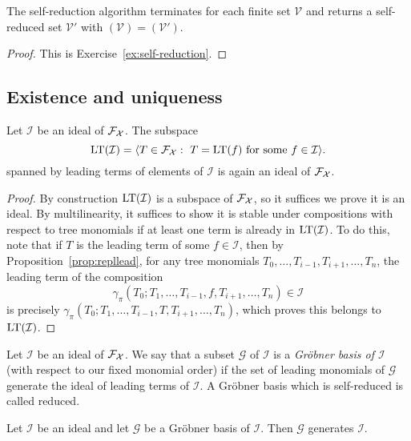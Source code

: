  \begin{proposition}\label{lemma:self-reduction}
 The self-reduction algorithm terminates for each
 finite set $\mathcal V$ and returns a self-reduced
 set $\mathcal V'$ with $(\mathcal V) = (\mathcal V')$.
\end{proposition}  

\begin{proof}
This is Exercise~\ref{ex:self-reduction}.
\end{proof}
\subsection{Existence and uniqueness}

\begin{lemma}
Let $\mathcal I$ be an ideal of $\mathcal{F}_{\mathcal{X}}$. The subspace 
\[
\operatorname{LT}(\mathcal I) = \langle T \in \mathcal{F}_{\mathcal{X}} : \text{ $T = 
	\operatorname{LT}(f)$ for some  $f\in\mathcal I$} \rangle.
\]
spanned by leading terms of elements of $\mathcal I$ is
again an ideal of $\mathcal{F}_{\mathcal{X}}$.
\end{lemma}

\begin{proof}
By construction $\operatorname{LT}(\mathcal I)$ is a subspace of $\mathcal{F}_{\mathcal{X}}$, so 
it suffices we prove it is an ideal. By multilinearity, it suffices
to show it is stable under compositions with respect to tree
monomials if at least one term is already in $\operatorname{LT}(\mathcal I)$.
To do this, note that if
$T$ is the leading term of some $f\in\mathcal I$, then by
Proposition~\ref{prop:repllead}, for any tree monomials
$T_0,\ldots,T_{i-1},T_{i+1},\ldots,T_n$, the leading term
of the composition 
\[ \gamma_\pi(T_0;T_1,\ldots,T_{i-1},f,T_{i+1},\ldots,T_n)\in \mathcal I\]
is precisely $\gamma_\pi(T_0;T_1,\ldots,T_{i-1},T,T_{i+1},\ldots,T_n)$,
which proves this belongs to $\operatorname{LT}(\mathcal I)$.
\end{proof}

\begin{definition}
Let $\mathcal I$ be an ideal of $\mathcal{F}_{\mathcal{X}}$. We say that a subset
$\mathcal G$ of $\mathcal I$ is a \emph{Gr\"obner basis of $\mathcal I$}
(with respect to our fixed monomial order) if the set of leading monomials
of $\mathcal G$ generate the ideal of leading terms of $\mathcal I$.
A Gr\"obner basis which is self-reduced is called reduced.
\end{definition}

\begin{lemma}
Let $\mathcal I$ be an ideal and let $\mathcal G$ be a 
Gr\"obner basis of $\mathcal I$. Then $\mathcal G$ 
generates $\mathcal I$.  
\end{lemma}

